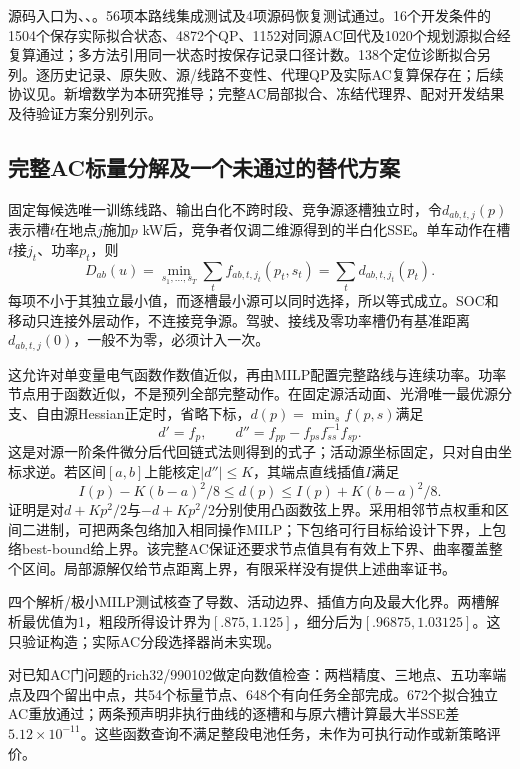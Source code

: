\documentclass[UTF8,fontset=fandol,11pt,a4paper]{ctexart}
\begin{document}
源码入口为、、。56项本路线集成测试及4项源码恢复测试通过。16个开发条件的1504个保存实际拟合状态、4872个QP、1152对同源AC回代及1020个规划源拟合经复算通过；多方法引用同一状态时按保存记录口径计数。138个定位诊断拟合另列。逐历史记录、原失败、源/线路不变性、代理QP及实际AC复算保存在；后续协议见。新增数学为本研究推导；完整AC局部拟合、冻结代理界、配对开发结果及待验证方案分别列示。
\subsection{完整AC标量分解及一个未通过的替代方案}
固定每候选唯一训练线路、输出白化不跨时段、竞争源逐槽独立时，令$d_{ab,t,j}(p)$表示槽$t$在地点$j$施加$p$ kW后，竞争者仅调二维源得到的半白化SSE。单车动作在槽$t$接$j_t$、功率$p_t$，则
\begin{equation}
 D_{ab}(u)=\min_{s_1,\ldots,s_T}\sum_t f_{ab,t,j_t}(p_t,s_t)
 =\sum_t d_{ab,t,j_t}(p_t).
 \label{eq:fixedtrain-scalar-separation}
\end{equation}
每项不小于其独立最小值，而逐槽最小源可以同时选择，所以等式成立。SOC和移动只连接外层动作，不连接竞争源。驾驶、接线及零功率槽仍有基准距离$d_{ab,t,j}(0)$，一般不为零，必须计入一次。

这允许对单变量电气函数作数值近似，再由MILP配置完整路线与连续功率。功率节点用于函数近似，不是预列全部完整动作。在固定源活动面、光滑唯一最优源分支、自由源Hessian正定时，省略下标，$d(p)=\min_s f(p,s)$满足
\[
 d'=f_p,\qquad d''=f_{pp}-f_{ps}f_{ss}^{-1}f_{sp}.
\]
这是对源一阶条件微分后代回链式法则得到的式子；活动源坐标固定，只对自由坐标求逆。若区间$[a,b]$上能核定$|d''|\le K$，其端点直线插值$I$满足
\begin{equation}
 I(p)-K(b-a)^2/8\le d(p)\le I(p)+K(b-a)^2/8.
 \label{eq:fixedtrain-scalar-interpolation}
\end{equation}
证明是对$d+Kp^2/2$与$-d+Kp^2/2$分别使用凸函数弦上界。采用相邻节点权重和区间二进制，可把两条包络加入相同操作MILP；下包络可行目标给设计下界，上包络best-bound给上界。该完整AC保证还要求节点值具有有效上下界、曲率覆盖整个区间。局部源解仅给节点距离上界，有限采样没有提供上述曲率证书。

四个解析/极小MILP测试核查了导数、活动边界、插值方向及最大化界。两槽解析最优值为1，粗段所得设计界为$[.875,1.125]$，细分后为$[.96875,1.03125]$。这只验证构造；实际AC分段选择器尚未实现。

对已知AC门问题的rich32/990102做定向数值检查：两档精度、三地点、五功率端点及四个留出中点，共54个标量节点、648个有向任务全部完成。672个拟合独立AC重放通过；两条预声明非执行曲线的逐槽和与原六槽计算最大半SSE差$5.12\times10^{-11}$。这些函数查询不满足整段电池任务，未作为可执行动作或新策略评价。
\end{document}
